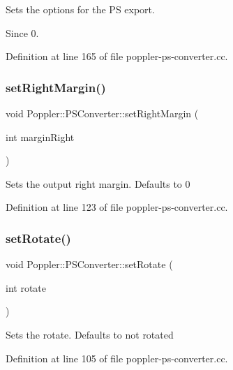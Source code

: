 Sets the options for the PS export.

\begin{DoxySince}{Since}
0. 
\end{DoxySince}


Definition at line 165 of file poppler-\/ps-\/converter.\+cc.

\mbox{\label{class_poppler_1_1_p_s_converter_a406eebb20d93933b9b4499d6848d9808}} 
\subsubsection{\texorpdfstring{set\+Right\+Margin()}{setRightMargin()}}
{\footnotesize\ttfamily void Poppler\+::\+P\+S\+Converter\+::set\+Right\+Margin (\begin{DoxyParamCaption}\item[{int}]{margin\+Right }\end{DoxyParamCaption})}

Sets the output right margin. Defaults to 0 

Definition at line 123 of file poppler-\/ps-\/converter.\+cc.

\mbox{\label{class_poppler_1_1_p_s_converter_ae17b403bf29c0123477b816fd9d8662c}} 
\subsubsection{\texorpdfstring{set\+Rotate()}{setRotate()}}
{\footnotesize\ttfamily void Poppler\+::\+P\+S\+Converter\+::set\+Rotate (\begin{DoxyParamCaption}\item[{int}]{rotate }\end{DoxyParamCaption})}

Sets the rotate. Defaults to not rotated 

Definition at line 105 of file poppler-\/ps-\/converter.\+cc.

\mbox{\label{class_poppler_1_1_p_s_converter_a27a0d7c675d881f4932e0f330da49a04}} 
